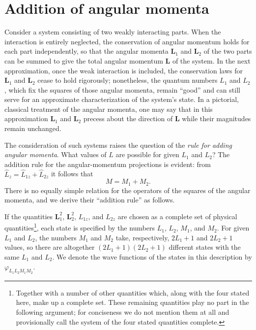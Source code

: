 \section{Addition of angular momenta}

Consider a system consisting of two weakly interacting parts. When the
interaction is entirely neglected, the conservation of angular momentum holds
for each part independently, so that the angular momenta $\mathbf L_1$ and
$\mathbf L_2$ of the two parts can be summed to give the total angular
momentum $\mathbf L$ of the system. In the next approximation, once the weak interaction is included,
the conservation laws for $\mathbf L_1$ and $\mathbf L_2$ cease to hold
rigorously; nonetheless, the quantum numbers $L_1$ and $L_2$, which fix the
squares of those angular momenta, remain “good” and can still serve for an
approximate characterization of the system's state. In a pictorial, classical treatment of the angular momenta, one may
say that in this approximation $\mathbf L_1$ and $\mathbf L_2$ precess about
the direction of $\mathbf L$ while their magnitudes remain unchanged.

The consideration of such systems raises the question of the
\emph{rule for adding angular momenta}. What values of $L$ are possible for
given $L_1$ and $L_2$? The addition rule for
the angular-momentum projections is evident: from
$\hat L_z=\hat L_{1z}+\hat L_{2z}$ it follows that
\begin{equation}
  M=M_1+M_2.
  \tag{31.1}
\end{equation}
There is no equally simple relation for the operators of the squares of the
angular momenta, and we derive their “addition rule” as follows.

If the quantities $\mathbf L_1^2$, $\mathbf L_2^2$, $L_{1z}$, and $L_{2z}$
are chosen as a complete set of physical quantities\footnote{Together with a
number of other quantities which, along with the four stated here, make up a
complete set. These remaining quantities play no part in the following
argument; for conciseness we do not mention them at all and provisionally
call the system of the four stated quantities complete.}, each state is
specified by the numbers $L_1$, $L_2$, $M_1$, and $M_2$. For given $L_1$ and
$L_2$, the numbers $M_1$ and $M_2$ take, respectively, $2L_1+1$ and
$2L_2+1$ values, so there are altogether
$(2L_1+1)(2L_2+1)$ different states with the same $L_1$ and $L_2$. We denote
the wave functions of the states in this description by
$\varphi_{L_1L_2M_1M_2}$.

